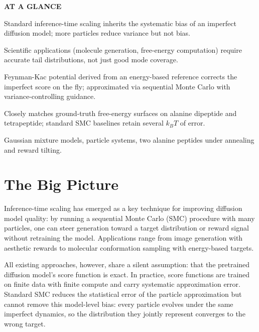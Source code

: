 \documentclass[10pt,twocolumn]{article}
\begin{document}
\begin{mdframed}[backgroundcolor=boxgray,linecolor=rulered,linewidth=1pt,
    innerleftmargin=6pt,innerrightmargin=6pt,
    innertopmargin=6pt,innerbottommargin=6pt]
\textbf{\small AT A GLANCE}\par\vspace{4pt}
\begin{description}[leftmargin=0pt,labelsep=4pt,itemsep=2pt,parsep=0pt,
    font=\small\bfseries]
  \item[Problem:] Standard inference-time scaling inherits the systematic bias of an
    imperfect diffusion model; more particles reduce variance but not bias.
  \item[Why it matters:] Scientific applications (molecule generation, free-energy
    computation) require accurate tail distributions, not just good mode coverage.
  \item[Method:] Feynman-Kac potential derived from an energy-based reference corrects
    the imperfect score on the fly; approximated via sequential Monte Carlo with
    variance-controlling guidance.
  \item[Result:] Closely matches ground-truth free-energy surfaces on alanine dipeptide
    and tetrapeptide; standard SMC baselines retain several $k_BT$ of error.
  \item[Evidence:] Gaussian mixture models, particle systems, two alanine peptides under
    annealing and reward tilting.
\end{description}
\end{mdframed}

\section{The Big Picture}

Inference-time scaling has emerged as a key technique for improving diffusion model
quality: by running a sequential Monte Carlo (SMC) procedure with many particles, one
can steer generation toward a target distribution or reward signal without retraining
the model. Applications range from image generation with aesthetic rewards to
molecular conformation sampling with energy-based targets.

All existing approaches, however, share a silent assumption: that the pretrained
diffusion model's score function is exact. In practice, score functions are trained
on finite data with finite compute and carry systematic approximation error.
Standard SMC reduces the statistical error of the particle approximation but cannot
remove this model-level bias: every particle evolves under the same imperfect dynamics,
so the distribution they jointly represent converges to the wrong target.
\end{document}
